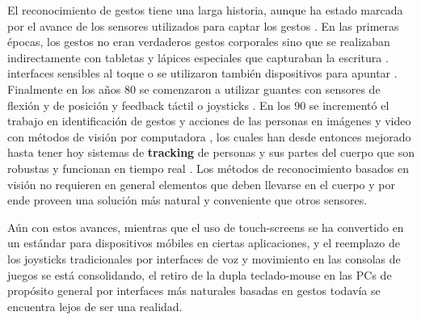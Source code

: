 El reconocimiento de gestos tiene una larga historia, aunque ha estado marcada por el avance de los sensores utilizados para captar los gestos \cite{myers1998}. En las primeras épocas, los gestos no eran verdaderos gestos corporales sino que se realizaban indirectamente con tabletas y lápices especiales que capturaban la escritura \cite{davis1964,ellis1969,Coleman1969}. interfaces sensibles al toque \cite{madeira1978} o se utilizaron también dispositivos para apuntar \cite{Bolt1980}. Finalmente en los años 80 se comenzaron a utilizar guantes con sensores de flexión y de posición y feedback táctil \cite{zimmerman1987} o joysticks \cite{pausch1992}. En los 90 se incrementó el trabajo en identificación de gestos y acciones de las personas en imágenes y video con métodos de visión por computadora \cite{tamura1988,yamato1992}, los cuales han desde entonces mejorado hasta tener hoy sistemas de \textbf{tracking} de personas y sus partes del cuerpo que son robustas y funcionan en tiempo real \cite{Shotton2011}. Los métodos de reconocimiento basados en visión no requieren en general elementos que deben llevarse en el cuerpo y por ende proveen una solución más natural y conveniente que otros sensores.  

Aún con estos avances, mientras que el uso de touch-screens se ha convertido en un estándar para dispositivos móbiles en ciertas aplicaciones, y el reemplazo de los joysticks tradicionales por interfaces de voz y movimiento en las consolas de juegos se está consolidando, el retiro de la dupla teclado-mouse en las PCs de propósito general por interfaces más naturales basadas en gestos todavía se encuentra lejos de ser una realidad. 

